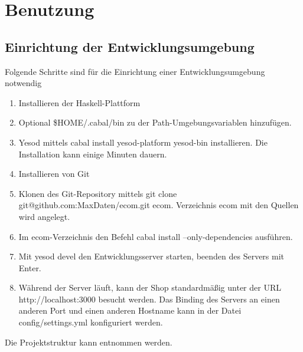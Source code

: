 \chapter{Benutzung}

\section{Einrichtung der Entwicklungsumgebung}
Folgende Schritte sind für die Einrichtung einer Entwicklungsumgebung notwendig

\begin{enumerate}
  \item Installieren der Haskell-Plattform \cite{HasP}
  \vspace*{-0.5em}
  \item Optional \textsf{\$HOME/.cabal/bin} zu der \textsf{Path}-Umgebungsvariablen hinzufügen.
  \vspace*{-0.5em}
  \item Yesod mittels \textsf{cabal install yesod-platform yesod-bin} installieren. Die Installation kann einige Minuten dauern. 
  \vspace*{-0.5em}
  \item Installieren von Git \cite{GitIn}
  \vspace*{-0.5em}
  \item Klonen des Git-Repository mittels \textsf{git clone git@github.com:MaxDaten/ecom.git ecom}. Verzeichnis \textsf{ecom} mit den Quellen wird angelegt.
  \vspace*{-0.5em}
  \item Im \textsf{ecom}-Verzeichnis den Befehl \textsf{cabal install --only-dependencies} ausführen.
  \vspace*{-0.5em}
  \item Mit \textsf{yesod devel} den Entwicklungsserver starten, beenden des Servers mit Enter. 
  \vspace*{-0.5em}
  \item Während der Server läuft, kann der Shop standardmäßig unter der URL \\ \textsf{http://localhost:3000} besucht werden. Das Binding des Servers an einen anderen Port und einen anderen Hostname kann in der Datei \textsf{config/settings.yml} konfiguriert werden.
\end{enumerate}

Die Projektstruktur kann  entnommen werden.

